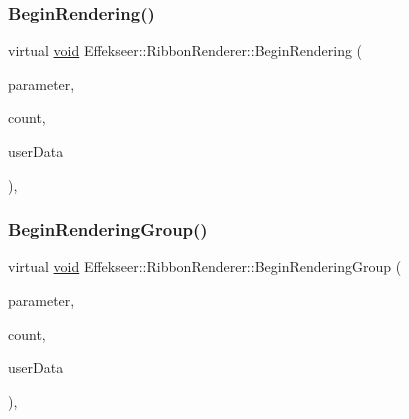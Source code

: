 \subsubsection{\texorpdfstring{Begin\+Rendering()}{BeginRendering()}}
{\footnotesize\ttfamily virtual \mbox{\hyperlink{namespace_effekseer_ab34c4088e512200cf4c2716f168deb56}{void}} Effekseer\+::\+Ribbon\+Renderer\+::\+Begin\+Rendering (\begin{DoxyParamCaption}\item[{const \mbox{\hyperlink{struct_effekseer_1_1_ribbon_renderer_1_1_node_parameter}{Node\+Parameter}} \&}]{parameter,  }\item[{int32\+\_\+t}]{count,  }\item[{\mbox{\hyperlink{namespace_effekseer_ab34c4088e512200cf4c2716f168deb56}{void}} $\ast$}]{user\+Data }\end{DoxyParamCaption})\hspace{0.3cm}{\ttfamily [inline]}, {\ttfamily [virtual]}}

\mbox{\label{class_effekseer_1_1_ribbon_renderer_aff959e008c9c35c170ea835eb4a66b35}} 
\subsubsection{\texorpdfstring{Begin\+Rendering\+Group()}{BeginRenderingGroup()}}
{\footnotesize\ttfamily virtual \mbox{\hyperlink{namespace_effekseer_ab34c4088e512200cf4c2716f168deb56}{void}} Effekseer\+::\+Ribbon\+Renderer\+::\+Begin\+Rendering\+Group (\begin{DoxyParamCaption}\item[{const \mbox{\hyperlink{struct_effekseer_1_1_ribbon_renderer_1_1_node_parameter}{Node\+Parameter}} \&}]{parameter,  }\item[{int32\+\_\+t}]{count,  }\item[{\mbox{\hyperlink{namespace_effekseer_ab34c4088e512200cf4c2716f168deb56}{void}} $\ast$}]{user\+Data }\end{DoxyParamCaption})\hspace{0.3cm}{\ttfamily [inline]}, {\ttfamily [virtual]}}

\mbox{\label{class_effekseer_1_1_ribbon_renderer_ae8e99c5d635d3128047017c0f3c595bd}} 
